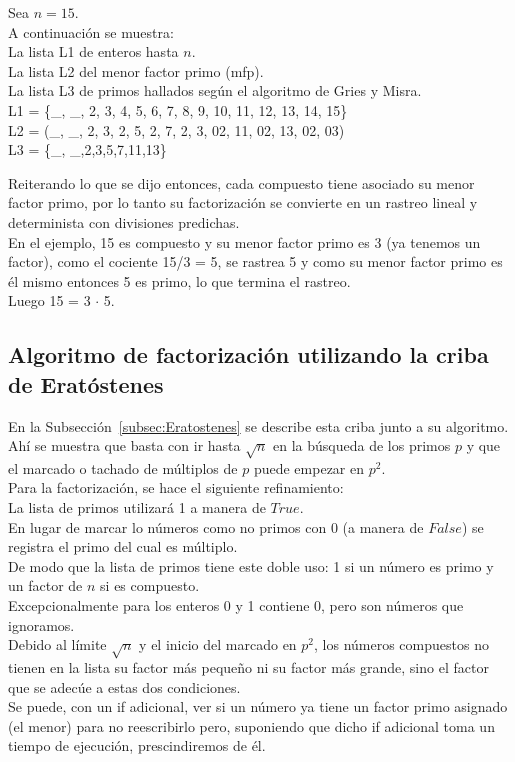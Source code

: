 \begin{ejemplo}
Sea $n=15$. \\
A continuación se muestra: \\
La lista L1 de enteros hasta $n$. \\
La lista L2 del menor factor primo (mfp). \\
La lista L3 de primos hallados según el algoritmo de Gries y Misra. \\
L1 = \{\_, \_, 2, 3, 4, 5, 6, 7, 8, 9, 10, 11, 12, 13, 14, 15\} \\ 
L2 = (\_, \_, 2, 3, 2, 5, 2, 7, 2, 3,  02, 11, 02, 13, 02, 03) \\ 
L3 =  \{\_, \_,2,3,5,7,11,13\}
\end{ejemplo}

Reiterando lo que se dijo entonces, cada compuesto tiene asociado su menor factor primo, por lo tanto su factorización se convierte en un rastreo lineal y determinista con divisiones predichas. \\
En el ejemplo, 15 es compuesto y su menor factor primo es 3 (ya tenemos un factor), como el cociente 15/3 = 5, se rastrea 5 y como su menor factor primo es él mismo entonces 5 es primo, lo que termina el rastreo. \\
Luego 15 = 3 $\cdot$ 5.

\subsection{Algoritmo de factorización utilizando la criba de Eratóstenes}
En la Subsección~\ref{subsec:Eratostenes} se describe esta criba junto a su algoritmo. \\
Ahí se muestra que basta con ir hasta $\sqrt n$ en la búsqueda de los primos $p$ y que el marcado o tachado de múltiplos de $p$ puede empezar en $p^2$. \\
Para la factorización, se hace el siguiente refinamiento: \\
La lista de primos utilizará 1 a manera de $True$. \\
En lugar de marcar lo números como no primos con 0 (a manera de $False$) se registra el primo del cual es múltiplo. \\
De modo que la lista de primos tiene este doble uso: 1 si un número es primo y un factor de $n$ si es compuesto. \\
Excepcionalmente para los enteros 0 y 1 contiene 0, pero son números que ignoramos. \\
Debido al límite  $\sqrt n$ y el inicio del marcado en $p^2$, los números compuestos no tienen en la lista su factor más pequeño ni su factor más grande, sino el factor que se adecúe a estas dos condiciones. \\
Se puede, con un if adicional, ver si un número ya tiene un factor primo asignado (el menor) para no reescribirlo pero, suponiendo que dicho if adicional toma un tiempo de ejecución, prescindiremos de él. \\

